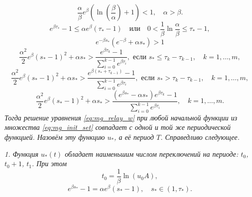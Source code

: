 \begin{equation}
	\label{eq:intro:cond_thm1}
	\frac{\alpha}{\beta}e^{\beta}\left(\ln\left(\frac{\beta}{\alpha}\right)+1\right) < 1,
	\quad
	\alpha > \beta.
\end{equation}
%
\begin{equation}
	\label{eq:intro:cond_thm2}
	e^{\beta \tau_*}-1 \leqslant \alpha e^\beta(\tau_*-1)
	\quad\text{или}\quad
	0 < \frac{1}{\beta}\ln\frac{\alpha}{\beta}\leqslant\tau_*-1,
\end{equation}
%
\begin{equation}
	\label{eq:intro:cond_th_w>1_t_1+1}
	e^{-\beta s_*}(e^{-\beta}+\alpha s_*)>1
\end{equation}
%
\begin{equation}
	\label{eq:intro:cond_hair_hair_01}
	\frac{\alpha^2}{2}e^\beta(s_*-1)^2+\alpha s_*>\frac{e^{\beta \tau_k}-1}{\sum_{i=0}^{k-1}e^{\beta \tau_i}},\text{ если } s_*\leqslant \tau_k-\tau_{k-1},\quad k=1,\ldots,m,
\end{equation}
%
\begin{equation}
	\label{eq:intro:cond_hair_hair_02}
	\frac{\alpha^2}{2}e^\beta(s_*-1)^2+\alpha s_*>\frac{e^{\beta (s_*+\tau_{k-1})}-1}{\sum_{i=0}^{k-1}e^{\beta \tau_i}},\text{ если } s_* > \tau_k-\tau_{k-1},\quad k=1,\ldots,m,
\end{equation}
%
\begin{equation}
	\label{eq:intro:cond_hair_hair_1}
	\frac{\alpha^2}{2}e^\beta( s_*-1)^2+\alpha s_*>\frac{(e^{\beta s_*}-\alpha s_*)e^{\beta \tau_k}-1}{\sum_{i=0}^{k-1}e^{\beta \tau_i}},\quad k=1,\ldots,m.
\end{equation}
\textit{Тогда решение уравнения \eqref{eq:mg_relay_w} при любой начальной функции из множества \eqref{eq:mg_init_set} совпадает с одной и той же периодической функцией. Назовём эту функцию $u_*$, а её период $T$. Справедливо следующее.}

\textit{1. Функция $u_*(t)$ обладает наименьшим числом переключений на периоде: $t_0$, $t_0+1$, $t_1$. При этом }
%
\begin{equation*}
	t_0=\frac{1}{\beta}\ln(u_0 A),
\end{equation*}
\begin{equation}
	e^{\beta s_*} - 1=\alpha e^{\beta}(s_* - 1), \quad s_* \in (1, \tau_*).
\end{equation}

